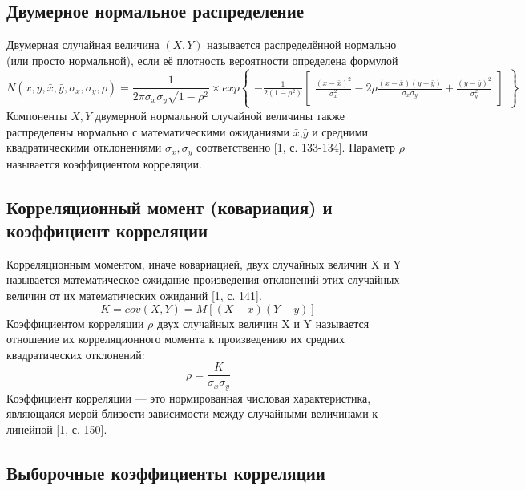 \subsection{Двумерное нормальное распределение}
Двумерная случайная величина $(X,Y)$ называется распределённой нормально (или просто нормальной), если её плотность вероятности определена формулой
\begin{equation}
N(x, y, \bar{x}, \bar{y}, \sigma_{x}, \sigma_{y}, \rho) = 
\frac{1}{2\pi\sigma_{x}\sigma_{y}\sqrt{1-\rho^{2}}} \times
exp{\begin{Bmatrix}
	-\frac{1}{2(1-\rho^{2})}
	\begin{bmatrix}
	\frac{(x-\bar{x})^{2}}{\sigma_{x}^{2}} - 2\rho\frac{(x-\bar{x})(y-\bar{y})}{\sigma_{x}\sigma_{y}} + \frac{(y-\bar{y})^{2}}{\sigma_{y}^{2}}
	\end{bmatrix}
	\end{Bmatrix}}
\end{equation}
Компоненты $X,Y$ двумерной нормальной случайной величины также распределены нормально с математическими ожиданиями $\bar{x}$,$\bar{y}$ и средними квадратическими отклонениями $\sigma_{x},\sigma_{y}$ соответственно [1, с. 133-134].
Параметр $\rho$ называется коэффициентом корреляции.



\subsection{Корреляционный момент (ковариация) и коэффициент корреляции}
Корреляционным моментом, иначе ковариацией, двух случайных величин X и Y называется математическое ожидание произведения отклонений этих случайных величин от их математических ожиданий [1, с. 141].
\begin{equation}
K = cov(X, Y) = M[(X - \bar{x})(Y - \bar{y})]
\label{K}
\end{equation}
Коэффициентом корреляции $\rho$ двух случайных величин X и Y называется отношение их корреляционного момента к произведению их средних квадратических отклонений:
\begin{equation}
\rho = \frac{K}{\sigma_{x}\sigma_{y}}
\label{ro}
\end{equation}
Коэффициент корреляции — это нормированная числовая характеристика, являющаяся мерой близости зависимости между случайными величинами к линейной [1, с. 150].

\subsection{Выборочные коэффициенты корреляции}
